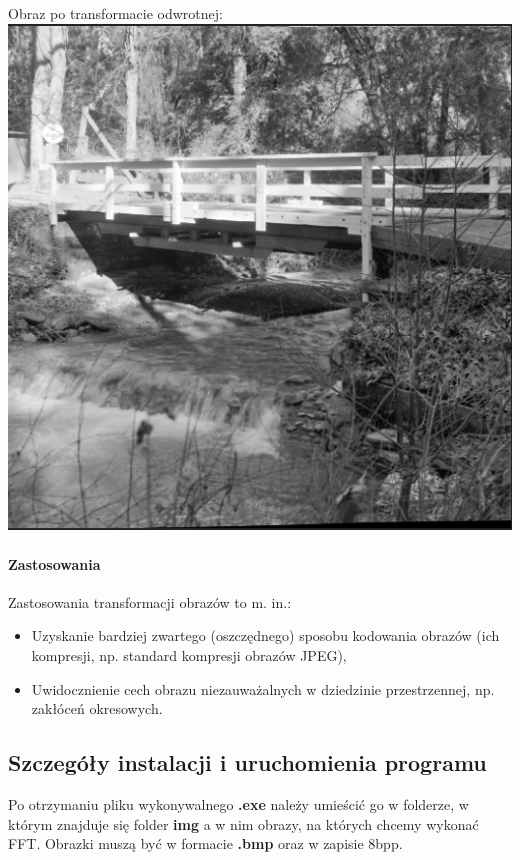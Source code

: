 Obraz po transformacie odwrotnej:\\

\includegraphics[scale=0.4]{figures/bridge2.png}\\

\paragraph{Zastosowania} Zastosowania transformacji obrazów to m. in.:
\begin{itemize}
	\item Uzyskanie bardziej zwartego (oszczędnego) sposobu kodowania obrazów
	(ich kompresji, np. standard kompresji obrazów JPEG),
	\item Uwidocznienie cech obrazu niezauważalnych w dziedzinie przestrzennej,
	np. zakłóceń okresowych.
\end{itemize}
\subsection{Szczegóły instalacji i uruchomienia programu} 
Po otrzymaniu pliku wykonywalnego \textbf{.exe} należy umieścić go w folderze, w którym znajduje się folder \textbf{img} a w nim obrazy, na których chcemy wykonać FFT. Obrazki muszą być w formacie \textbf{.bmp} oraz w zapisie 8bpp. 

